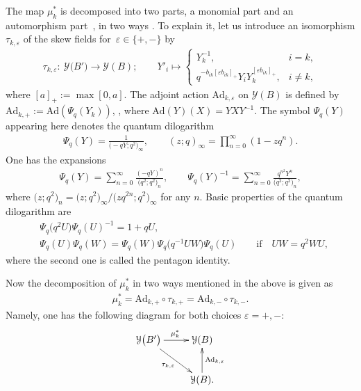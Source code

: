 \documentclass[pdftex]{sigma}
\def\ve{{\varepsilon}}
\numberwithin{equation}{section}
\begin{document}
The map $\mu_k^{\ast}$ is decomposed into two parts, a monomial part
and an automorphism part~\cite{FG09}, in two ways \cite{Ke11}. To explain it,
let us introduce an isomorphism $\tau_{k,\varepsilon}$ of the
skew fields for~${\varepsilon \in \{+,-\}}$ by
\begin{align}\label{tauy}
\tau_{k,\ve} \colon\ \mathcal{Y}\bigl(B'\bigr) \to \mathcal{Y}(B)
; \qquad Y'_i \mapsto
\begin{cases}
 Y_k^{-1}, & i= k,
 \\
 q^{-b_{ik}[\ve b_{ik}]_+}Y_i Y_k^{[\ve b_{ik}]_+}, & i \neq k,
\end{cases}
\end{align}
where $[a]_+ := \max[0,a]$.
The adjoint action $\mathrm{Ad}_{k,\ve}$ on $\mathcal{Y}(B)$ is defined by
$\mathrm{Ad}_{k,+} := \mathrm{Ad}(\Psi_{q}(Y_k)) $, ,
where $\mathrm{Ad}(Y)(X) = YXY^{-1}$.
The symbol $\Psi_q(Y)$ appearing here denotes the quantum dilogarithm
\begin{align}\label{Psiq}
\Psi_q(Y) = \frac{1}{\bigl(-qY; q^2\bigr)_\infty}, \qquad (z;q)_\infty = \prod_{n=0}^\infty (1-zq^n).
\end{align}
One has the expansions
\begin{align}\label{expa}
\Psi_q(Y) = \sum_{n = 0}^\infty \frac{(-qY)^n}{\bigl(q^2;q^2\bigr)_n},
\qquad
\Psi_q(Y)^{-1} = \sum_{n = 0}^\infty \frac{q^{n^2} Y^n}{\bigl(q^2;q^2\bigr)_n},
\end{align}
where $\bigl(z;q^2\bigr)_n = \bigl(z;q^2\bigr)_\infty/\bigl(zq^{2n};q^2\bigr)_\infty$ for any $n$.
Basic properties of the quantum dilogarithm are{\samepage
\begin{align}%
\label{Prec}
&\Psi_q\bigl(q^2 U\bigr) \Psi_q(U)^{-1} = 1+qU,
\\
&\Psi_q(U)\Psi_q(W) = \Psi_q(W) \Psi_q\bigl(q^{-1}UW\bigr) \Psi_q(U) \qquad \text{if}\quad UW = q^2WU,\nonumber
\end{align}
where the second one is called the pentagon identity.}

Now the decomposition of $\mu^\ast_k$ in two ways mentioned in the above
is given as
\begin{align}\label{mud}
\mu_k^{\ast} = \mathrm{Ad}_{k,+} \circ \tau_{k,+}
= \mathrm{Ad}_{k,-} \circ \tau_{k,-}.
\end{align}
Namely, one has the following diagram for both choices $\ve=+, -$:
\begin{align*}
\xymatrix{
\mathcal{Y}\bigl(B'\bigr) \ar[r]^{\mu_k^\ast} \ar[dr]_{\tau_{k,\ve}} & \mathcal{Y}(B)
\\
& \mathcal{Y}(B) \ar[u]_{\mathrm{Ad}_{k,\ve}}.
}
\end{align*}
\end{document}

